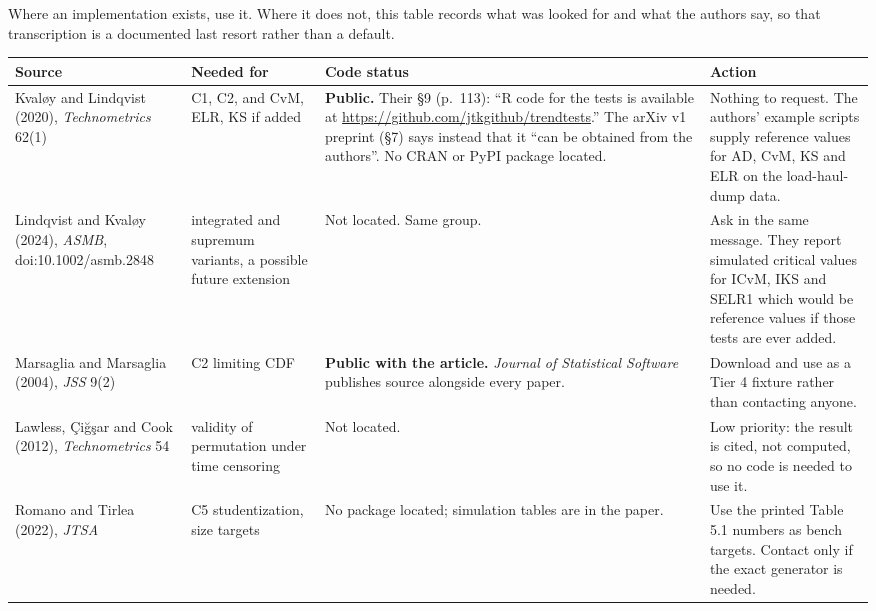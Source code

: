 \documentclass[11pt,a4paper]{article}
\begin{document}
Where an implementation exists, use it. Where it does not, this table records what was
looked for and what the authors say, so that transcription is a documented last resort
rather than a default.

\begin{center}
\small
\setlength{\tabcolsep}{4pt}
\begin{tabular}{@{}>{\raggedright\arraybackslash}p{}
                 >{\raggedright\arraybackslash}p{}
                 >{\raggedright\arraybackslash}p{}
                 >{\raggedright\arraybackslash}p{}@{}}
\toprule
\textbf{Source} & \textbf{Needed for} & \textbf{Code status} & \textbf{Action}\\
\midrule
Kvaløy and Lindqvist (2020), \emph{Technometrics} 62(1) &
C1, C2, and CvM, ELR, KS if added &
\textbf{Public.} Their \S 9 (p.~113): \enquote{R code for the tests is available at
\url{https://github.com/jtkgithub/trendtests}.} The arXiv v1 preprint (\S 7) says instead
that it \enquote{can be obtained from the authors}. No CRAN or PyPI package located. &
Nothing to request. The authors' example scripts supply reference values for AD, CvM, KS
and ELR on the load-haul-dump data.\\[3pt]

Lindqvist and Kvaløy (2024), \emph{ASMB}, doi:10.1002/asmb.2848 &
integrated and supremum variants, a possible future extension &
Not located. Same group. &
Ask in the same message. They report simulated critical values for ICvM, IKS and SELR1
which would be reference values if those tests are ever added.\\[3pt]

Marsaglia and Marsaglia (2004), \emph{JSS} 9(2) &
C2 limiting CDF &
\textbf{Public with the article.} \emph{Journal of Statistical Software} publishes source
alongside every paper. &
Download and use as a Tier 4 fixture rather than contacting anyone.\\[3pt]

Lawless, Çiğşar and Cook (2012), \emph{Technometrics} 54 &
validity of permutation under time censoring &
Not located. &
Low priority: the result is cited, not computed, so no code is needed to use it.\\[3pt]

Romano and Tirlea (2022), \emph{JTSA} &
C5 studentization, size targets &
No package located; simulation tables are in the paper. &
Use the printed Table 5.1 numbers as bench targets. Contact only if the exact generator
is needed.\\[3pt]


\end{tabular}
\end{center}
\end{document}
